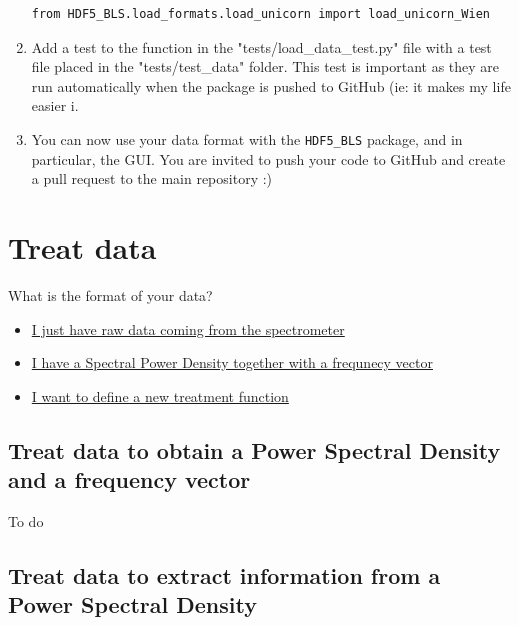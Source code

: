 \documentclass[a4paper,12pt]{article}
\begin{document}
\begin{enumerate}
\begin{lstlisting}
from HDF5_BLS.load_formats.load_unicorn import load_unicorn_Wien
\end{lstlisting}
            \item Add a test to the function in the "tests/load\_data\_test.py" file with a test file placed in the "tests/test\_data" folder. This test is important as they are run automatically when the package is pushed to GitHub (ie: it makes my life easier ^^). 
            \item You can now use your data format with the \texttt{HDF5\_BLS} package, and in particular, the GUI. You are invited to push your code to GitHub and create a pull request to the main repository :)
        \end{enumerate}

\section{Treat data} \label{sec:treatment}

    \begin{tcolorbox}
        What is the format of your data?
        \begin{itemize}
            \item \hyperref[subsec:treatment.toPSD]{I just have raw data coming from the spectrometer}
            \item \hyperref[subsec:treatment.toInfo]{I have a Spectral Power Density together with a frequnecy vector}
            \item \hyperref[subsec:treatment.new]{I want to define a new treatment function}
        \end{itemize}
    \end{tcolorbox}

    \subsection{Treat data to obtain a Power Spectral Density and a frequency vector} \label{subsec:treatment.toPSD}
        \begin{tcolorbox}
            To do
        \end{tcolorbox}

    \subsection{Treat data to extract information from a Power Spectral Density} \label{subsec:treatment.toInfo}
\end{document}
